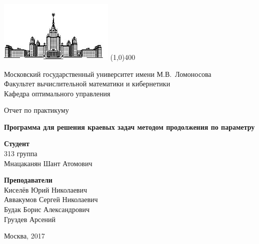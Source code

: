 \documentclass[oneside,final,12pt]{extreport}
\begin{document}
	\begin{titlepage} 
		\begin{center} 
		
			\includegraphics[width=55mm]{msu} 
			\line(1,0){400}
		
			Московский государственный университет имени М.В.~Ломоносова\\ 
			Факультет вычислительной математики и кибернетики\\ 
			Кафедра оптимального управления 
		
			\vspace{3.5cm} 
		
			{\Large Отчет по практикуму}
		
			\vspace{1cm} 
		
			{\Large{\textbf{Программа для решения краевых задач методом продолжения по параметру\\}}}
		
		\end{center} 
	
		\vfill 
	
		\begin{flushright} 
			\textbf{Студент}\\ 
			313 группа \\ Мнацаканян Шант Атомович
		\end{flushright}
	
	
		\begin{flushright} 
			\textbf{Преподаватели}\\ 
			Киселёв Юрий Николаевич\\
			Аввакумов Сергей Николаевич\\
			Будак Борис Александрович\\
			Груздев Арсений
		\end{flushright} 
	
		\vfill 
	
		\begin{center} 
			Москва, 2017 
		\end{center} 
	
		\enlargethispage{4\baselineskip} 
	
\end{titlepage}
\end{document}
